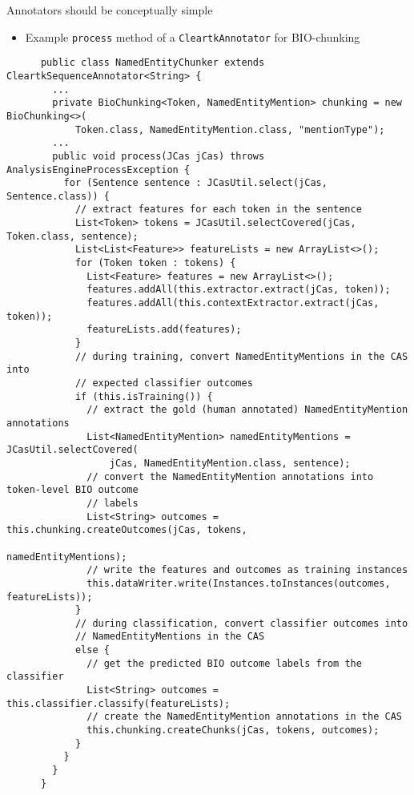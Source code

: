 \documentclass[final]{beamer}
\newcommand{\code}[1]{\texttt{\small #1}}
\begin{document}
\begin{frame}[fragile]
\begin{columns}[t]
\begin{column}{.45\linewidth}
\begin{block}{Annotators should be conceptually simple}
\begin{itemize}
            \item Example \code{process} method of a \code{CleartkAnnotator} for BIO-chunking
    \end{itemize}
    \begin{lstlisting}
      public class NamedEntityChunker extends CleartkSequenceAnnotator<String> {
        ...
        private BioChunking<Token, NamedEntityMention> chunking = new BioChunking<>(
            Token.class, NamedEntityMention.class, "mentionType");
        ...
        public void process(JCas jCas) throws AnalysisEngineProcessException {
          for (Sentence sentence : JCasUtil.select(jCas, Sentence.class)) {
            // extract features for each token in the sentence
            List<Token> tokens = JCasUtil.selectCovered(jCas, Token.class, sentence);
            List<List<Feature>> featureLists = new ArrayList<>();
            for (Token token : tokens) {
              List<Feature> features = new ArrayList<>();
              features.addAll(this.extractor.extract(jCas, token));
              features.addAll(this.contextExtractor.extract(jCas, token));
              featureLists.add(features);
            }
            // during training, convert NamedEntityMentions in the CAS into 
            // expected classifier outcomes
            if (this.isTraining()) {
              // extract the gold (human annotated) NamedEntityMention annotations
              List<NamedEntityMention> namedEntityMentions = JCasUtil.selectCovered(
                  jCas, NamedEntityMention.class, sentence);
              // convert the NamedEntityMention annotations into token-level BIO outcome 
              // labels
              List<String> outcomes = this.chunking.createOutcomes(jCas, tokens, 
                                                                   namedEntityMentions);
              // write the features and outcomes as training instances
              this.dataWriter.write(Instances.toInstances(outcomes, featureLists));
            }
            // during classification, convert classifier outcomes into 
            // NamedEntityMentions in the CAS
            else {
              // get the predicted BIO outcome labels from the classifier
              List<String> outcomes = this.classifier.classify(featureLists);
              // create the NamedEntityMention annotations in the CAS
              this.chunking.createChunks(jCas, tokens, outcomes);
            }
          }
        }
      }
    \end{lstlisting}
    \end{block}


\end{column}
\end{columns}
\end{frame}
\end{document}
